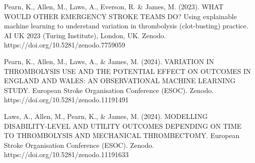 Pearn, K., Allen, M., Laws, A., Everson, R. & James, M. (2023). WHAT WOULD OTHER EMERGENCY STROKE TEAMS DO? Using explainable machine learning to understand variation in thrombolysis (clot-busting) practice. AI UK 2023 (Turing Institute), London, UK. Zenodo. https://doi.org/10.5281/zenodo.7759059

Pearn, K., Allen, M., Laws, A., & James, M. (2024). VARIATION IN THROMBOLYSIS USE AND THE POTENTIAL EFFECT ON OUTCOMES IN ENGLAND AND WALES: AN OBSERVATIONAL MACHINE LEARNING STUDY. European Stroke Organisation Conference (ESOC). Zenodo. https://doi.org/10.5281/zenodo.11191491

Laws, A., Allen, M., Pearn, K., & James, M. (2024). MODELLING DISABILITY-LEVEL AND UTILITY OUTCOMES DEPENDING ON TIME TO THROMBOLYSIS AND MECHANICAL THROMBECTOMY. European Stroke Organisation Conference (ESOC). Zenodo. https://doi.org/10.5281/zenodo.11191633

